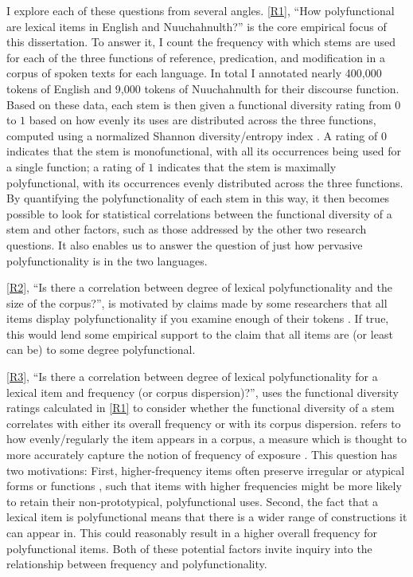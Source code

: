 I explore each of these questions from several angles. \ref{R1}, \enquote{How polyfunctional are lexical items in English and Nuuchahnulth?} is the core empirical focus of this dissertation. To answer it, I count the frequency with which stems are used for each of the three functions of reference, predication, and modification in a corpus of spoken texts for each language. In total I annotated nearly 400,000 tokens of English and 9,000 tokens of Nuuchahnulth for their discourse function. Based on these data, each stem is then given a functional diversity rating from $0$ to $1$ based on how evenly its uses are distributed across the three functions, computed using a normalized Shannon diversity/entropy index \parencite{Shannon1948}. A rating of $0$ indicates that the stem is monofunctional, with all its occurrences being used for a single function; a rating of $1$ indicates that the stem is maximally polyfunctional, with its occurrences evenly distributed across the three functions. By quantifying the polyfunctionality of each stem in this way, it then becomes possible to look for statistical correlations between the functional diversity of a stem and other factors, such as those addressed by the other two research questions. It also enables us to answer the question of just how pervasive polyfunctionality is in the two languages.

\ref{R2}, \enquote{Is there a correlation between degree of lexical polyfunctionality and the size of the corpus?}, is motivated by claims made by some researchers that all items display polyfunctionality if you examine enough of their tokens \parencite[77]{MoselHovdhaugen1992}. If true, this would lend some empirical support to the claim that all items are (or least can be) to some degree polyfunctional.

\ref{R3}, \enquote{Is there a correlation between degree of lexical polyfunctionality for a lexical item and frequency (or corpus dispersion)?}, uses the functional diversity ratings calculated in \ref{R1} to consider whether the functional diversity of a stem correlates with either its overall frequency or with its corpus dispersion.  refers to how evenly/regularly the item appears in a corpus, a measure which is thought to more accurately capture the notion of frequency of exposure \parencites{Gries2008}{Griesfc}. This question has two motivations: First, higher-frequency items often preserve irregular or atypical forms or functions \parencite[Ch.~13]{Bybee2007}, such that items with higher frequencies might be more likely to retain their non-prototypical, polyfunctional uses. Second, the fact that a lexical item is polyfunctional means that there is a wider range of constructions it can appear in. This could reasonably result in a higher overall frequency for polyfunctional items. Both of these potential factors invite inquiry into the relationship between frequency and polyfunctionality.

